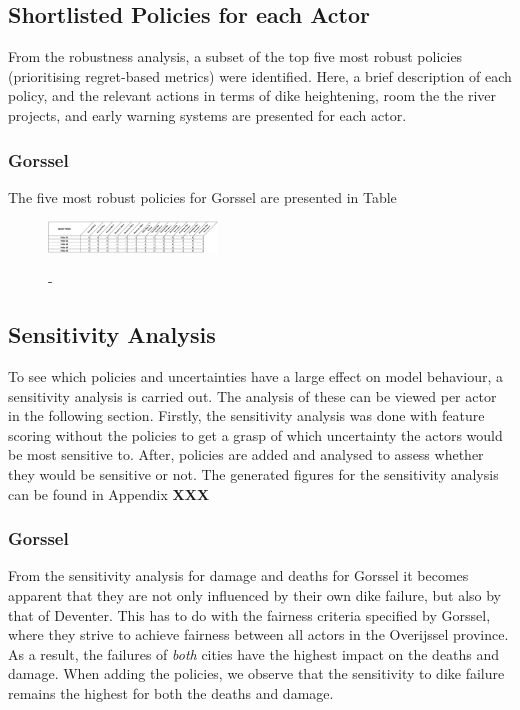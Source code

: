 \subsection{Shortlisted Policies for each Actor}
From the robustness analysis, a subset of the top five most robust policies (prioritising regret-based metrics) were identified. Here, a brief description of each policy, and the relevant actions in terms of dike heightening, room the the river projects, and early warning systems are presented for each actor.
\subsubsection{Gorssel}
The five most robust policies for Gorssel are presented in Table
\begin{figure}[h]
    \centering
    \caption{-}
    \includegraphics[width=0.4\textwidth]{report/figures/gpols.png}
    \label{fig:msmordm}
\end{figure}




\subsection{Sensitivity Analysis}

To see which policies and uncertainties have a large effect on model behaviour, a sensitivity analysis is carried out. The analysis of these can be viewed per actor in the following section. Firstly, the sensitivity analysis was done with feature scoring without the policies to get a grasp of which uncertainty the actors would be most sensitive to. After, policies are added and analysed to assess whether they would be sensitive or not. The generated figures for the sensitivity analysis can be found in Appendix \textbf{XXX}

\subsubsection{Gorssel}

From the sensitivity analysis for damage and deaths for Gorssel it becomes apparent that they are not only influenced by their own dike failure, but also by that of Deventer. This has to do with the fairness criteria specified by Gorssel, where they strive to achieve fairness between all actors in the Overijssel province. As a result, the failures of \textit{both} cities have the highest impact on the deaths and damage. When adding the policies, we observe that the sensitivity to dike failure remains the highest for both the deaths and damage. 

